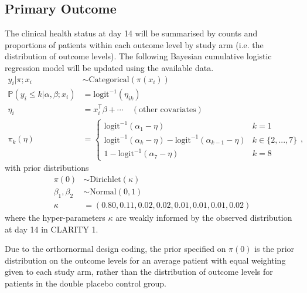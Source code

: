 \documentclass[11pt,parskip=half-]{scrartcl}
\begin{document}
\subsection{Primary Outcome}\label{sec:primary-outcome-analysis}
The clinical health status at day 14 will be summarised by counts and proportions of patients within each outcome level by study arm (i.e. the distribution of outcome levels). The following Bayesian cumulative logistic regression model will be updated using the available data.
$$
    \begin{aligned}
        y_{i} | \pi;x_i                            & \sim \text{Categorical}(\pi(x_i))                              \\
        \mathbb P(y_i \leq k | \alpha, \beta; x_i) & = \text{logit}^{-1}(\eta_{ik})                                 \\
        \eta_{i}                                   & = x_i^{\mathsf{T}}\beta + \cdots\quad(\text{other covariates}) \\
        \pi_k(\eta)                                & = \begin{cases}
            \text{logit}^{-1}(\alpha_1 - \eta)                                            & k=1             \\
            \text{logit}^{-1}(\alpha_{k} - \eta) - \text{logit}^{-1}(\alpha_{k-1} - \eta) & k\in\{2,...,7\} \\
            1 - \text{logit}^{-1}(\alpha_{7} - \eta)                                      & k=8
        \end{cases},
    \end{aligned}
$$
with prior distributions
$$
    \begin{aligned}
        \pi(0)          & \sim \text{Dirichlet}(\kappa)                      \\
        \beta_1,\beta_2 & \sim \text{Normal}(0, 1)                           \\
        \kappa          & = (0.80, 0.11, 0.02, 0.02, 0.01, 0.01, 0.01, 0.02)
    \end{aligned}
$$
where the hyper-parameters $\kappa$ are weakly informed by the observed distribution at day 14 in CLARITY 1.

Due to the orthornormal design coding, the prior specified on $\pi(0)$ is the prior distribution on the outcome levels for an average patient with equal weighting given to each study arm, rather than the distribution of outcome levels for patients in the double placebo control group.
\end{document}
